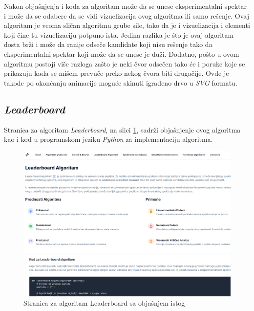 \documentclass[12pt,oneside]{memoir}
\begin{document}
Nakon objašnjenja i koda za algoritam može da se unese eksperimentalni spektar i može da se odabere da se vidi vizuelizacija ovog algoritma ili samo rešenje. Ovaj algoritam je veoma sličan algoritmu grube sile, tako da je i vizuelizacija i elementi koji čine tu vizuelizaciju potpuno ista. Jedina razlika je što je ovaj algoritam dosta brži i može da ranije odseče kandidate koji nisu rešenje tako da eksperimentalni spektar koji može da se unese je duži. Dodatno, pošto u ovom algoritmu postoji više razloga zašto je neki čvor odsečen tako će i poruke koje se prikazuju kada se mišem prevuče preko nekog čvora biti drugačije. Ovde je takođe po okončanju animacije moguće skinuti igrađeno drvo u \emph{SVG} formatu.

\subsection{\emph{Leaderboard}}
Stranica za algoritam \emph{Leaderboard}, na slici \ref{fig:leaderboard_1}, sadrži objašnjenje ovog algoritma kao i kod u programskom jeziku \emph{Python} za implementaciju algoritma.
\begin{figure}[H]
\centering
\includegraphics[width=1\textwidth]{images/leaderboard_1.png}
\caption{Stranica za algoritam Leaderboard sa objašnjem istog}
\label{fig:leaderboard_1}
\end{figure}
\end{document}

